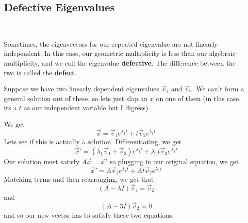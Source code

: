 \documentclass{article}
\begin{document}
\subsection{Defective Eigenvalues}
\ 
\begin{definition}
Sometimes, the eigenvectors for our repeated eigenvalue are not linearly independent. In this case, our geometric multiplicity is less than our algebraic multiplicity, and we call the eigenvalue \textbf{defective}. The difference between the two is called the \textbf{defect}.   
\end{definition}

Suppose we have two linearly dependent eigenvalues $\vec{v}_1$ and $\vec{v}_2$. We can't form a general solution out of these, so lets just slap an $x$ on one of them (in this case, its a $t$ as our independent variable but I digress). 

We get $$\vec{x} = \vec{v}_1 e^{\lambda_1t} + t\vec{v}_2 e^{\lambda_1t}$$Lets see if this is actually a solution. Differentiating, we get $$\vec{x}' = (\lambda_1\vec{v}_1 + \vec{v}_2)e^{\lambda_1 t} + \lambda_1t\vec{v}_2e^{\lambda_1 t}$$Our solution must satisfy $A\vec{x} = \vec{x}'$ so plugging in our original equation, we get $$\vec{x}' = A\vec{v}_1e^{\lambda_1t} + At\vec{v}_2e^{\lambda_1t}$$Matching terms and then rearranging, we get that $$(A-\lambda I)\vec{v}_1 = \vec{v}_2$$and$$(A-3I)\vec{v}_2 = 0$$and so our new vector has to satisfy these two equations. 
\end{document}
